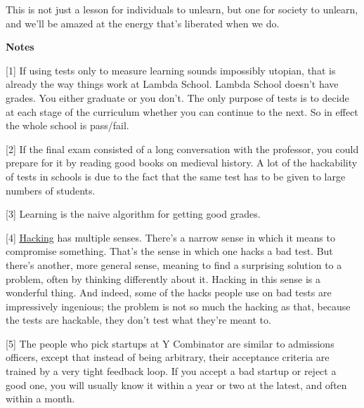 This
                  is not just a lesson for individuals to unlearn, but one for
                  society to unlearn, and we'll be amazed at the energy that's
                  liberated when we do.












                  \textbf{Notes}

[1] If using tests only to measure
                  learning sounds impossibly utopian, that is already the way
                  things work at Lambda School. Lambda School doesn't have
                  grades. You either graduate or you don't. The only purpose of
                  tests is to decide at each stage of the curriculum whether you
                  can continue to the next. So in effect the whole school is
                  pass/fail.

[2] If the final exam consisted of a
                  long conversation with the professor, you could prepare for it
                  by reading good books on medieval history. A lot of the
                  hackability of tests in schools is due to the fact that the
                  same test has to be given to large numbers of students.

[3]
                  Learning is the naive algorithm for getting good grades.

[4]
                  \href{http://www.paulgraham.com/gba.html}{\underline{Hacking}} has multiple senses.
                  There's a narrow sense in which it means to compromise
                  something. That's the sense in which one hacks a bad test. But
                  there's another, more general sense, meaning to find a
                  surprising solution to a problem, often by thinking
                  differently about it. Hacking in this sense is a wonderful
                  thing. And indeed, some of the hacks people use on bad tests
                  are impressively ingenious; the problem is not so much the
                  hacking as that, because the tests are hackable, they don't
                  test what they're meant to.

[5] The people who pick
                  startups at Y Combinator are similar to admissions officers,
                  except that instead of being arbitrary, their acceptance
                  criteria are trained by a very tight feedback loop. If you
                  accept a bad startup or reject a good one, you will usually
                  know it within a year or two at the latest, and often within a
                  month.

